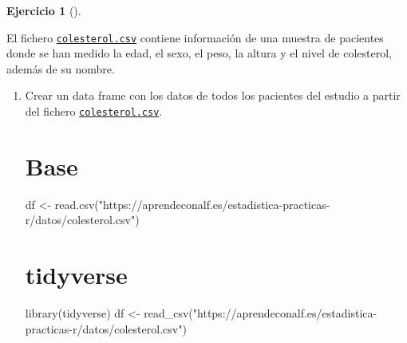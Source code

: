 \documentclass[
  spanish,
  a4paper,
]{scrreport}
\newenvironment{Shaded}{\begin{snugshade}}{\end{snugshade}}
\newcommand{\FunctionTok}[1]{\textcolor[rgb]{0.28,0.35,0.67}{#1}}
\newcommand{\NormalTok}[1]{\textcolor[rgb]{0.00,0.23,0.31}{#1}}
\newcommand{\OtherTok}[1]{\textcolor[rgb]{0.00,0.23,0.31}{#1}}
\newcommand{\StringTok}[1]{\textcolor[rgb]{0.13,0.47,0.30}{#1}}
\theoremstyle{definition}
\newtheorem{exercise}{Ejercicio}[chapter]
\theoremstyle{remark}
\begin{document}
\begin{exercise}[]\protect\hypertarget{exr-descriptiva-colesterol}{}\label{exr-descriptiva-colesterol}

El fichero \href{datos/colesterol.csv}{\texttt{colesterol.csv}} contiene
información de una muestra de pacientes donde se han medido la edad, el
sexo, el peso, la altura y el nivel de colesterol, además de su nombre.

\begin{enumerate}
\def\labelenumi{\alph{enumi}.}
\item
  Crear un data frame con los datos de todos los pacientes del estudio a
  partir del fichero
  \href{datos/colesterol.csv}{\texttt{colesterol.csv}}.

  \begin{tcolorbox}[enhanced jigsaw, colback=white, coltitle=black, toprule=.15mm, rightrule=.15mm, opacitybacktitle=0.6, opacityback=0, bottomtitle=1mm, toptitle=1mm, titlerule=0mm, breakable, leftrule=.75mm, title=\textcolor{quarto-callout-tip-color}{\faLightbulb}\hspace{0.5em}{Solución}, arc=.35mm, left=2mm, bottomrule=.15mm, colframe=quarto-callout-tip-color-frame, colbacktitle=quarto-callout-tip-color!10!white]

  \section{Base}

\begin{Shaded}
\begin{Highlighting}[]
\NormalTok{df }\OtherTok{\textless{}{-}} \FunctionTok{read.csv}\NormalTok{(}\StringTok{"https://aprendeconalf.es/estadistica{-}practicas{-}r/datos/colesterol.csv"}\NormalTok{)}
\end{Highlighting}
\end{Shaded}

  \section{tidyverse}

\begin{Shaded}
\begin{Highlighting}[]
\FunctionTok{library}\NormalTok{(tidyverse)}
\NormalTok{df }\OtherTok{\textless{}{-}} \FunctionTok{read\_csv}\NormalTok{(}\StringTok{"https://aprendeconalf.es/estadistica{-}practicas{-}r/datos/colesterol.csv"}\NormalTok{)}
\end{Highlighting}
\end{Shaded}


\end{tcolorbox}
\end{enumerate}
\end{exercise}
\end{document}
